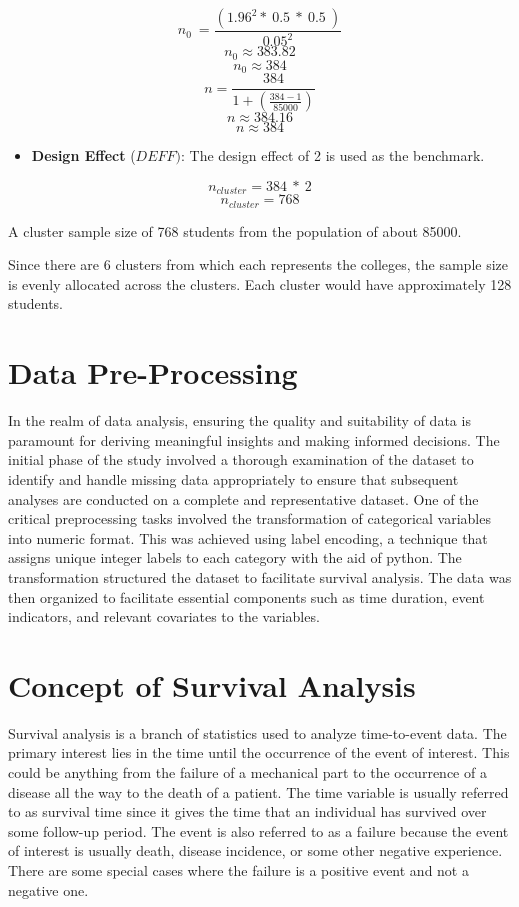 \documentclass[12pt]{report}
\begin{document}
	
	\[n_0\ =\frac{\left({1.96}^2\ast\ 0.5\ \ast\ 0.5\ \right)}{{0.05}^2}\]
	\[n_0\approx383.82\]
	\[n_0\approx384\]
	\[n=\frac{384}{1+(\frac{384-1}{85000})}\]
	\[n\approx384.16\]
	\[n\approx384\]
	
	\begin{itemize}
		\item \textbf{Design Effect} (\({DEFF})\): The design effect of 2 is used as the benchmark.
		
	\end{itemize}
	\[n_{cluster}=384\ \ast\ 2\]
	\[n_{cluster}=768\]
	
	A cluster sample size of 768 students from the population of about 85000.
	
	Since there are 6 clusters from which each represents the colleges, the sample size is evenly allocated across the clusters. Each cluster would have approximately 128 students.
	
	
	
	\section{Data Pre-Processing}
	
	In the realm of data analysis, ensuring the quality and suitability of data is paramount for deriving meaningful insights and making informed decisions. The initial phase of the study involved a thorough examination of the dataset to identify and handle missing data appropriately to ensure that subsequent analyses are conducted on a complete and representative dataset. One of the critical preprocessing tasks involved the transformation of categorical variables into numeric format. This was achieved using label encoding, a technique that assigns unique integer labels to each category with the aid of python. The transformation structured the dataset to facilitate survival analysis. The data was then organized to facilitate essential components such as time duration, event indicators, and relevant covariates to the variables. 
	
	\section{Concept of Survival Analysis}
	
	Survival analysis is a branch of statistics used to analyze time-to-event data. The primary interest lies in the time until the occurrence of the event of interest. This could be anything from the failure of a mechanical part to the occurrence of a disease all the way to the death of a patient. The time variable is usually referred to as survival time since it gives the time that an individual has survived over some follow-up period. The event is also referred to as a failure because the event of interest is usually death, disease incidence, or some other negative experience. There are some special cases where the failure is a positive event and not a negative one.
	
\end{document}
